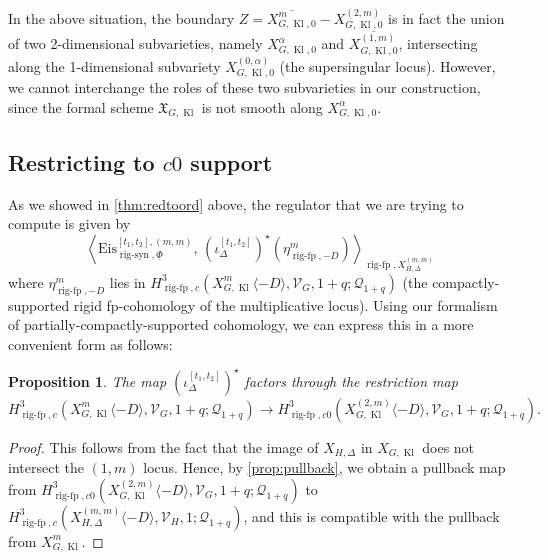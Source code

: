 \documentclass[cjm]{ipart}
\theoremstyle{plain}
\newtheorem{proposition}[theorem]{Proposition}
\theoremstyle{remark}
\DeclareMathOperator{\Kl}{Kl}
\DeclareMathOperator{\rigfp}{rig-fp}
\DeclareMathOperator{\rigsyn}{rig-syn}
\newcommand{\Eis}{\mathrm{Eis}}
\newcommand{\cQ}{\mathcal{Q}}
\newcommand{\cV}{\mathcal{V}}
\numberwithin{equation}{subsection}
\begin{document}
  \begin{remark}
   In the above situation, the boundary $Z = \overline{X_{G, \Kl, 0}^m} - X_{G, \Kl, 0}^{(2, m)}$ is in fact the union of two 2-dimensional subvarieties, namely $X_{G, \Kl, 0}^{\alpha}$ and $\overline{X_{G, \Kl, 0}^{(1, m)}}$, intersecting along the 1-dimensional subvariety $X_{G, \Kl, 0}^{(0, \alpha)}$ (the supersingular locus). However, we cannot interchange the roles of these two subvarieties in our construction, since the formal scheme $\mathfrak{X}_{G, \Kl}$ is not smooth along $X_{G, \Kl, 0}^{\alpha}$.
  \end{remark}

 \subsection{Restricting to \texorpdfstring{$c0$}{c0} support}

  As we showed in \cref{thm:redtoord} above, the regulator that we are trying to compute is given by
  \[ \left\langle \Eis^{[t_1,t_2],(m,m)}_{\rigsyn,\underline\Phi},\, (\iota_\Delta^{[t_1,t_2]})^\star( \eta_{\rigfp,-D}^{m})\right\rangle_{\rigfp, X^{(m, m)}_{H,\Delta}} \]
  where $\eta_{\rigfp,-D}^{m}$ lies in $H^3_{\rigfp, c}\left(X_{G,\Kl}^{m}\langle -D\rangle, \cV_G, 1+q; \cQ_{1+q}\right)$ (the compactly-supported rigid fp-co\-hom\-ology of the multiplicative locus). Using our formalism of partially-compactly-supported cohomology, we can express this in a more convenient form as follows:

  \begin{proposition}\label{prop:restricttoc0}
   The map $(\iota_\Delta^{[t_1,t_2]})^\star$ factors through the restriction map
   \[
    H^3_{\rigfp, c}\left(X_{G,\Kl}^{m}\langle -D\rangle, \cV_G, 1+q; \cQ_{1+q}\right) \to
    H^3_{\rigfp, c0}\left(X_{G,\Kl}^{(2, m)}\langle -D\rangle, \cV_G, 1+q; \cQ_{1+q}\right).
   \]
  \end{proposition}

  \begin{proof}
   This follows from the fact that the image of $X_{H, \Delta}$ in $X_{G, \Kl}$ does not intersect the $(1, m)$ locus. Hence, by \cref{prop:pullback}, we obtain a pullback map from $H^3_{\rigfp, c0}\left(X_{G,\Kl}^{(2, m)}\langle -D\rangle, \cV_G, 1+q; \cQ_{1+q} \right)$ to $H^3_{\rigfp, c}\left(X_{H,\Delta}^{(m, m)}\langle -D\rangle, \cV_H, 1; \cQ_{1+q} \right)$, and this is compatible with the pullback from $X_{G,\Kl}^{m}$.
  \end{proof}
\end{document}
